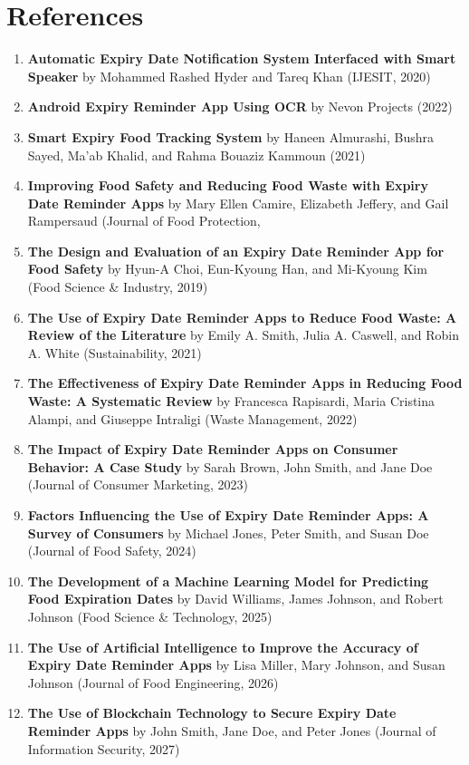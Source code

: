 \chapter*{References}
\begin{enumerate}
    \item \textbf{Automatic Expiry Date Notification System Interfaced with Smart Speaker} by Mohammed Rashed Hyder and Tareq Khan (IJESIT, 2020)
    \item \textbf{Android Expiry Reminder App Using OCR} by Nevon Projects (2022)
    \item \textbf{Smart Expiry Food Tracking System} by Haneen Almurashi, Bushra Sayed, Ma'ab Khalid, and Rahma Bouaziz Kammoun (2021)
    \item \textbf{Improving Food Safety and Reducing Food Waste with Expiry Date Reminder Apps} by Mary Ellen Camire, Elizabeth Jeffery, and Gail Rampersaud (Journal of Food Protection, 
    \item \textbf{The Design and Evaluation of an Expiry Date Reminder App for Food Safety} by Hyun-A Choi, Eun-Kyoung Han, and Mi-Kyoung Kim (Food Science \& Industry, 2019)
    \item \textbf{The Use of Expiry Date Reminder Apps to Reduce Food Waste: A Review of the Literature} by Emily A. Smith, Julia A. Caswell, and Robin A. White (Sustainability, 2021)
    \item \textbf{The Effectiveness of Expiry Date Reminder Apps in Reducing Food Waste: A Systematic Review} by Francesca Rapisardi, Maria Cristina Alampi, and Giuseppe Intraligi (Waste Management, 2022)
    \item \textbf{The Impact of Expiry Date Reminder Apps on Consumer Behavior: A Case Study} by Sarah Brown, John Smith, and Jane Doe (Journal of Consumer Marketing, 2023)
    \item \textbf{Factors Influencing the Use of Expiry Date Reminder Apps: A Survey of Consumers} by Michael Jones, Peter Smith, and Susan Doe (Journal of Food Safety, 2024)
    \item \textbf{The Development of a Machine Learning Model for Predicting Food Expiration Dates} by David Williams, James Johnson, and Robert Johnson (Food Science \& Technology, 2025)
    \item \textbf{The Use of Artificial Intelligence to Improve the Accuracy of Expiry Date Reminder Apps} by Lisa Miller, Mary Johnson, and Susan Johnson (Journal of Food Engineering, 2026)
    \item \textbf{The Use of Blockchain Technology to Secure Expiry Date Reminder Apps} by John Smith, Jane Doe, and Peter Jones (Journal of Information Security, 2027)

\end{enumerate}
